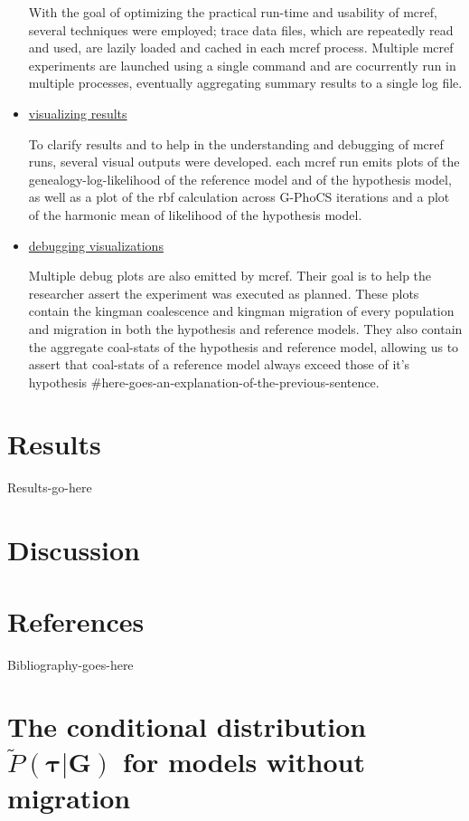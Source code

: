\documentclass[11pt]{article}
\newcommand{\vect}[1]{\boldsymbol{\mathbf{#1}}}
\newcommand{\Tr}{\mathcal{T}}
\newcommand{\G}{\vect{G}}
\newcommand{\Pref}{\widetilde{P}}
\newcommand{\1}{\mathbbm{1}}
\newcommand{\gp}{G-PhoCS }
\newcommand{\taus}{\vect\tau}
\begin{document}
\begin{itemize}
With the goal of optimizing the practical run-time and usability of mcref, several techniques were employed; trace data files, which are repeatedly read and used, are lazily loaded and cached in each mcref process. Multiple mcref experiments are launched using a single command and are cocurrently run in multiple processes, eventually aggregating summary results to a single log file. 

\item \underline{visualizing results}

To clarify results and to help in the understanding and debugging of mcref runs, several visual outputs were developed. each mcref run emits plots of the genealogy-log-likelihood of the reference model and of the hypothesis model, as well as a plot of the rbf calculation across \gp iterations and a plot of the harmonic mean of likelihood of the hypothesis model.

\item \underline{debugging visualizations}

Multiple debug plots are also emitted by mcref. Their goal is to help the researcher assert the experiment was executed as planned. These plots contain the kingman coalescence and kingman migration of every population and migration in both the hypothesis and reference models. They also contain the aggregate coal-stats of the hypothesis and reference model, allowing us to assert that coal-stats of a reference model always exceed those of it's hypothesis \#here-goes-an-explanation-of-the-previous-sentence. 
\end{itemize}



\section{Results}
Results-go-here

\section{Discussion}

\newpage

\section{References}
Bibliography-goes-here


\newpage


\appendix
\newcommand{\anc}{\geq_\Tr}
\newcommand{\nanc}{\ngeq_\Tr}
\section{\texorpdfstring{The conditional distribution $\Pref(\taus|\G)$ for models without migration}{Conditional distribution without migration}}\label{ap:cond_nomig}
\end{document}
